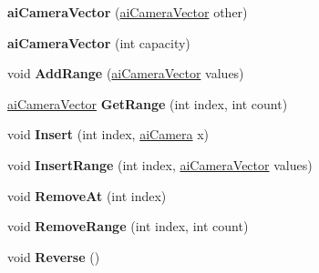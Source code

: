 \begin{DoxyCompactItemize}
\item 
\hypertarget{classai_camera_vector_a99c6451bcdb9732afccfe3149544497d}{{\bfseries ai\+Camera\+Vector} (\hyperlink{classai_camera_vector}{ai\+Camera\+Vector} other)}\label{classai_camera_vector_a99c6451bcdb9732afccfe3149544497d}

\item 
\hypertarget{classai_camera_vector_a5d68593ca1f7c2290c3c3c0254eb7380}{{\bfseries ai\+Camera\+Vector} (int capacity)}\label{classai_camera_vector_a5d68593ca1f7c2290c3c3c0254eb7380}

\item 
\hypertarget{classai_camera_vector_af0dbc3c002ca226a821fa0e2f54cc434}{void {\bfseries Add\+Range} (\hyperlink{classai_camera_vector}{ai\+Camera\+Vector} values)}\label{classai_camera_vector_af0dbc3c002ca226a821fa0e2f54cc434}

\item 
\hypertarget{classai_camera_vector_a1b6de6f4ee25474e8a4d463eb9a3bd32}{\hyperlink{classai_camera_vector}{ai\+Camera\+Vector} {\bfseries Get\+Range} (int index, int count)}\label{classai_camera_vector_a1b6de6f4ee25474e8a4d463eb9a3bd32}

\item 
\hypertarget{classai_camera_vector_a6b26d501b954a651ea55ec5008043b80}{void {\bfseries Insert} (int index, \hyperlink{structai_camera}{ai\+Camera} x)}\label{classai_camera_vector_a6b26d501b954a651ea55ec5008043b80}

\item 
\hypertarget{classai_camera_vector_a7e704423464a0a2ebf24bd61767e0397}{void {\bfseries Insert\+Range} (int index, \hyperlink{classai_camera_vector}{ai\+Camera\+Vector} values)}\label{classai_camera_vector_a7e704423464a0a2ebf24bd61767e0397}

\item 
\hypertarget{classai_camera_vector_a43dafb4daa38be06b40df6ffc7b9fe5b}{void {\bfseries Remove\+At} (int index)}\label{classai_camera_vector_a43dafb4daa38be06b40df6ffc7b9fe5b}

\item 
\hypertarget{classai_camera_vector_abf45d6357ba4354aa492846a41002ce8}{void {\bfseries Remove\+Range} (int index, int count)}\label{classai_camera_vector_abf45d6357ba4354aa492846a41002ce8}

\item 
\hypertarget{classai_camera_vector_a68bab604b11d89b7be8178f9f62f7c93}{void {\bfseries Reverse} ()}\label{classai_camera_vector_a68bab604b11d89b7be8178f9f62f7c93}


\end{DoxyCompactItemize}
